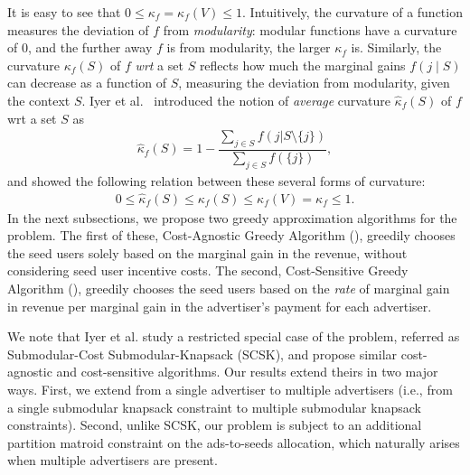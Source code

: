 It is easy to see that $0 \le \kappa_f = \kappa_f(V) \le 1$. Intuitively, the curvature of a function measures the deviation of $f$ from \emph{modularity}: modular functions have a curvature of $0$, and the further away $f$ is from modularity, the larger $\kappa_f$ is. Similarly, the curvature $\kappa_f(S)$ of $f$ \emph{wrt} a set $S$ reflects how much the marginal gains $f(j \mid S)$ can decrease as a function of $S$, measuring the deviation from modularity, given the context $S$.
Iyer et al.~\cite{iyer2015submodularthesis} introduced the notion of \emph{average} curvature $\hat{\kappa}_f(S)$ of $f$ wrt a set $S$ as
\begin{align*}
\hat{\kappa}_f(S) = 1 - \dfrac{\sum_{j \in S} f(j|S \setminus\{j\} )}{\sum_{j \in S} f(\{j\})},
\end{align*}
and showed the following relation between these several forms of curvature:
\begin{align*}
 0 \le \hat{\kappa}_f(S) \le \kappa_f(S)  \le \kappa_f(V) = \kappa_f \le 1.
\end{align*}
In the next subsections, we propose two greedy approximation algorithms for the \RM problem. The first of these, Cost-Agnostic Greedy Algorithm (\CARM), greedily chooses the seed users solely based on the marginal gain in the revenue, without considering seed user incentive costs. The second, Cost-Sensitive Greedy Algorithm (\CSRM), greedily chooses the seed users based on the \emph{rate} of marginal gain in revenue per marginal gain in the advertiser's payment for each advertiser.

We note that Iyer et al. \cite{iyer2013submodular, iyer2015submodularthesis} study a restricted special case of the \RM problem, referred as Submodular-Cost Submodular-Knapsack (SCSK), and propose similar cost-agnostic and cost-sensitive algorithms. Our results extend theirs in two major ways. First, we extend from a single advertiser to multiple advertisers (i.e., from
a single submodular knapsack constraint to multiple submodular knapsack constraints). Second, unlike SCSK, our \RM problem is  subject to an additional partition matroid constraint on the ads-to-seeds allocation, which naturally arises when multiple advertisers are present.

\enlargethispage{2\baselineskip}
